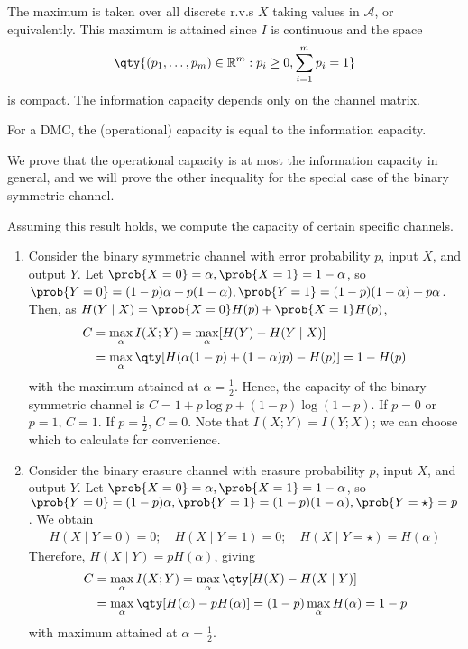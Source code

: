 The maximum is taken over all discrete r.v.s $X$ taking values in $\mathcal A$, or equivalently.
This maximum is attained since $I$ is continuous and the space
\begin{align*}
        \qty{(p_1, \dots, p_m) \in \mathbb R^m : p_i \geq 0, \sum_{i=1}^m p_i = 1}
    \end{align*}
is compact.
The information capacity depends only on the channel matrix.

\begin{theorem}
    For a DMC, the (operational) capacity is equal to the information capacity.
\end{theorem}

We prove that the operational capacity is at most the information capacity in general, and we will prove the other inequality for the special case of the binary symmetric channel.

\begin{example}
    Assuming this result holds, we compute the capacity of certain specific channels.
    \begin{enumerate}
        \item Consider the binary symmetric channel with error probability $p$, input $X$, and output $Y$.
        Let $\prob{X = 0} = \alpha, \prob{X = 1} = 1 - \alpha$, so $\prob{Y = 0} = (1-p)\alpha + p(1-\alpha), \prob{Y = 1} = (1-p)(1-\alpha) + p\alpha$.
        Then, as $H(Y \mid X) = \prob{X=0} H(p) + \prob{X = 1} H(p)$,
        \begin{align*}
            C &= \max_\alpha I(X;Y) = \max_\alpha [H(Y) - H(Y\mid X)] \\
            &= \max_\alpha \qty[H(\alpha(1-p) + (1-\alpha)p) - H(p)] = 1 - H(p)
       \end{align*}
        with the maximum attained at $\alpha = \frac{1}{2}$.
        Hence, the capacity of the binary symmetric channel is $C = 1 + p \log p + (1-p) \log (1-p)$.
        If $p = 0$ or $p = 1$, $C = 1$.
        If $p = \frac{1}{2}$, $C = 0$.
        Note that $I(X;Y) = I(Y;X)$; we can choose which to calculate for convenience.
        \item Consider the binary erasure channel with erasure probability $p$, input $X$, and output $Y$.
        Let $\prob{X = 0} = \alpha, \prob{X = 1} = 1 - \alpha$, so $\prob{Y = 0} = (1-p)\alpha, \prob{Y = 1} = (1-p)(1-\alpha), \prob{Y = \star} = p$.
        We obtain
        \begin{align*}
        H(X \mid Y = 0) = 0;\quad H(X \mid Y = 1) = 0;\quad H(X \mid Y = \star) = H(\alpha)
    \end{align*}
        Therefore, $H(X \mid Y) = pH(\alpha)$, giving
        \begin{align*}
            C &= \max_\alpha I(X;Y) = \max_\alpha \qty[H(X) - H(X \mid Y)] \\
            &= \max_\alpha \qty[H(\alpha) - pH(\alpha)] = (1-p) \max_\alpha H(\alpha) = 1-p
       \end{align*}
        with maximum attained at $\alpha = \frac{1}{2}$.
    \end{enumerate}
\end{example}

